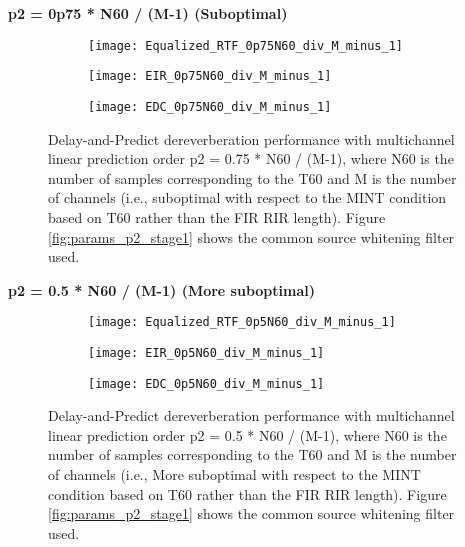 \textbf{p2 = 0p75 * N60 / (M-1) (Suboptimal)}

\begin{figure}[H]
	\centering
	\begin{subfigure}[b]{0.32\textwidth}
		\centering
		\texttt{[image: Equalized\_RTF\_0p75N60\_div\_M\_minus\_1]}
	\end{subfigure}
	\hfill
	\begin{subfigure}[b]{0.32\textwidth}
		\centering
		\texttt{[image: EIR\_0p75N60\_div\_M\_minus\_1]}
	\end{subfigure}
	\hfill
	\begin{subfigure}[b]{0.32\textwidth}
		\centering
		\texttt{[image: EDC\_0p75N60\_div\_M\_minus\_1]}
	\end{subfigure}
	\hfill
	\caption{Delay-and-Predict dereverberation performance with multichannel linear prediction order p2 = 0.75 * N60 / (M-1), where N60 is the number of samples corresponding to the T60 and M is the number of channels (i.e., suboptimal with respect to the MINT condition based on T60 rather than the FIR RIR length). Figure \ref{fig:params_p2_stage1} shows the common source whitening filter used.}
	\label{fig:params_p2_0p75_N60}
\end{figure}

\textbf{p2 = 0.5 * N60 / (M-1) (More suboptimal)}

\begin{figure}[H]
	\centering
	\begin{subfigure}[b]{0.32\textwidth}
		\centering
		\texttt{[image: Equalized\_RTF\_0p5N60\_div\_M\_minus\_1]}
	\end{subfigure}
	\hfill
	\begin{subfigure}[b]{0.32\textwidth}
		\centering
		\texttt{[image: EIR\_0p5N60\_div\_M\_minus\_1]}
	\end{subfigure}
	\hfill
	\begin{subfigure}[b]{0.32\textwidth}
		\centering
		\texttt{[image: EDC\_0p5N60\_div\_M\_minus\_1]}
	\end{subfigure}
	\hfill
	\caption{Delay-and-Predict dereverberation performance with multichannel linear prediction order p2 = 0.5 * N60 / (M-1), where N60 is the number of samples corresponding to the T60 and M is the number of channels (i.e., More suboptimal with respect to the MINT condition based on T60 rather than the FIR RIR length). Figure \ref{fig:params_p2_stage1} shows the common source whitening filter used.}
	\label{fig:params_p2_0p5_N60}
\end{figure}


